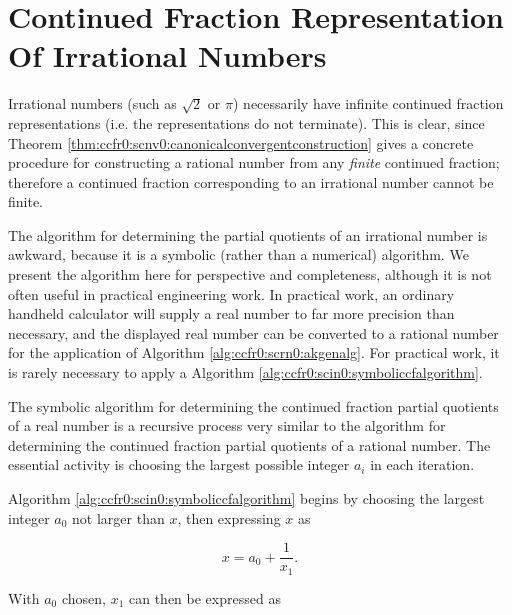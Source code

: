 \section[CF Representation Of Irrationals]
        {Continued Fraction Representation Of Irrational Numbers}
\label{ccfr0:scin0}

Irrational 
numbers (such as $\sqrt{2}$ or $\pi$) necessarily have infinite continued
fraction representations (i.e. the representations do not terminate).  This is clear, since 
Theorem \ref{thm:ccfr0:scnv0:canonicalconvergentconstruction} gives a concrete procedure 
for constructing a rational number from any \emph{finite} continued fraction; 
therefore a continued fraction corresponding to an irrational number
cannot be finite.

The algorithm for determining the partial quotients of an irrational number is
awkward, because it is a symbolic (rather than a numerical) algorithm.
We present the algorithm here for perspective and completeness, although it
is not often useful in practical engineering work.  In practical work, an
ordinary handheld calculator will supply a real number to far more precision
than necessary, and the displayed real number can be converted to a rational
number for the application of Algorithm \ref{alg:ccfr0:scrn0:akgenalg}.
For practical work, it is rarely necessary to apply a Algorithm 
\ref{alg:ccfr0:scin0:symboliccfalgorithm}.

The symbolic algorithm for determining the continued fraction partial quotients
of a real number is a recursive process very similar to the algorithm for
determining the continued fraction partial quotients of a rational number.
The essential activity is choosing the largest possible integer $a_i$ in each
iteration.

Algorithm \ref{alg:ccfr0:scin0:symboliccfalgorithm} begins by choosing
the largest integer $a_0$ not larger than $x$, then expressing $x$ as

\begin{equation}
x = a_0 + \frac{1}{x_1} .
\end{equation}

\noindent{}With $a_0$ chosen, $x_1$ can then be expressed as

